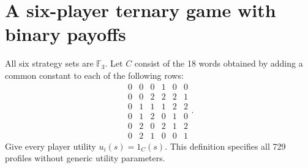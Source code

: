 \section{A six-player ternary game with binary payoffs}\label{sec:six}
All six strategy sets are $\mathbb F_3$. Let $C$ consist of the 18 words obtained
by adding a common constant to each of the following rows:
\[
\begin{array}{rrrrrr}
0&0&0&1&0&0\\0&0&2&2&2&1\\0&1&1&1&2&2\\
0&1&2&0&1&0\\0&2&0&2&1&2\\0&2&1&0&0&1
\end{array}.
\]
Give every player utility $u_i(s)=1_C(s)$. This definition specifies all 729
profiles without generic utility parameters.

